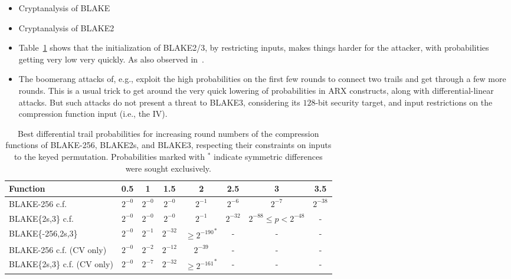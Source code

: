\documentclass[11pt,notitlepage,a4paper]{article}
\begin{document}
\begin{itemize}
  \item Cryptanalysis of BLAKE~\cite{DBLP:conf/cans/SuWWD10,DBLP:journals/ipl/VidaliNP10,DBLP:journals/iet-ifs/BaiYWW15,DBLP:conf/fse/AumassonGKMM10,DBLP:journals/iacr/JiL09,DK11,DBLP:conf/fse/BiryukovNR11}
  \item Cryptanalysis of BLAKE2~\cite{DBLP:conf/ctrsa/0001KNWW14,DBLP:conf/cisc/Hao14,DBLP:conf/crypto/EspitauFK15}
  \item Table~\ref{tab:trails} shows that the initialization of BLAKE2/3, by restricting inputs, makes things harder for the attacker, with probabilities getting very low very quickly. As also observed in~\cite[\S7]{DBLP:conf/ctrsa/0001KNWW14}. 
  \item The boomerang attacks of, e.g., \cite{DBLP:conf/cisc/Hao14,DBLP:conf/fse/BiryukovNR11,DBLP:journals/iet-ifs/BaiYWW15} exploit the high probabilities on the first few rounds to connect two trails and get through a few more rounds. This is a usual trick to get around the very quick lowering of probabilities in ARX constructs, along with differential-linear attacks. But such attacks do not present a threat to BLAKE3, considering its $128$-bit security target, and input restrictions on the compression function input (i.e., the IV).
\end{itemize}

\begin{table}
\centering
\caption{Best differential trail probabilities for increasing round numbers of the compression functions of BLAKE-256, BLAKE2s, and BLAKE3, respecting their constraints on inputs to the keyed permutation. Probabilities marked with ${}^\ast$ indicate symmetric differences were sought exclusively.}%
\label{tab:trails}
\begin{tabular}{lccccccc}
  \toprule
  Function & 0.5   & 1     & 1.5   & 2     & 2.5   & 3     & 3.5 \\ \midrule
  BLAKE-256 c.f. & $2^{-0}$ & $2^{-0}$ & $2^{-0}$ & $2^{-1}$ & $2^{-6}$ & $2^{-7}$ & $2^{-38}$  \\
  BLAKE\{2s,3\} c.f.   &  $2^{-0}$  & $2^{-0}$ &  $2^{-0}$  & $2^{-1}$ & $2^{-32}$   & $2^{-88} \le p<2^{-48}$ & -  \\
  BLAKE\{-256,2s,3\} & $2^{-0}$ & $2^{-1}$ & $2^{-32}$ & ${\ge 2^{-190}}^\ast$ & - & - & -  \\ %
  BLAKE-256 c.f. (CV only) & $2^{-0}$ & $2^{-2}$ & $2^{-12}$ & $2^{-39}$ & - & - & - \\
  BLAKE\{2s,3\} c.f. (CV only) & $2^{-0}$ & $2^{-7}$ & $2^{-32}$ & ${\ge 2^{-161}}^\ast$ & - & - & - \\ %
  \bottomrule
\end{tabular}
\end{table}
\end{document}
